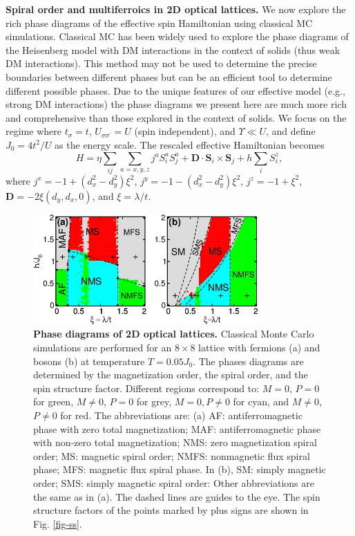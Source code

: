 \documentclass[a4paper,showpacs]{revtex4}
\begin{document}
\noindent \textbf{\small {Spiral order and multiferroics in 2D optical lattices.}} We now explore
the rich phase diagrams of the effective spin Hamiltonian using classical MC
simulations. Classical MC has been widely used to explore the phase
diagrams of the Heisenberg model with DM interactions in the context of
solids \cite{Liang-1,Liang-2, Liang-3, Jing} (thus weak DM interactions).
This method may not be used to determine the precise boundaries between
different phases but can be an efficient tool to determine different
possible phases. Due to the unique features of our effective model (e.g.,
strong DM interactions) the phase diagrams we present here are much more
rich and comprehensive than those explored in the context of solids. We
focus on the regime where $t_{\sigma }=t$, $U_{\sigma \sigma ^{\prime }}=U$
(spin independent), and $\Upsilon \ll U$, and define $J_{0}=4t^{2}/U$ as the
energy scale. The rescaled effective Hamiltonian becomes
\begin{equation}
H=\eta \sum_{ij}\sum_{a=x,y,z}j^{a}S_{i}^{a}S_{j}^{a}+\mathbf{D}\cdot
\mathbf{S}_{i}\times \mathbf{S}_{j}+h\sum_{i}S_{i}^{z},  \label{totalmodel}
\end{equation}%
where $j^{x}=-1+(d_{x}^{2}-d_{y}^{2})\xi ^{2}$, $%
j^{y}=-1-(d_{x}^{2}-d_{y}^{2})\xi ^{2}$, $j^{z}=-1+\xi ^{2}$, $\mathbf{D}%
=-2\xi (d_{y},d_{x},0)$, and $\xi =\lambda /t$.

\begin{figure}[b]
\centering
\includegraphics[width=3.4in]{new-phaseAB}
\caption{{\bf\sffamily Phase diagrams of 2D optical lattices.} Classical Monte Carlo simulations are performed for an $8\times 8$
lattice with fermions (a) and bosons (b) at temperature $T=0.05J_{0}$. The phases diagrams are determined by
the magnetization order, the spiral order, and the spin structure factor.
Different regions correspond to: $M=0$, $P=0$ for green, $M\neq 0$, $P=0$
for grey, $M=0,P\neq 0$ for cyan, and $M\neq 0$, $P\neq 0$ for red. The
abbreviations are: (a) AF: antiferromagnetic phase with zero total
magnetization; MAF: antiferromagnetic phase with non-zero total
magnetization; NMS: zero magnetization spiral order; MS: magnetic spiral
order; NMFS: nonmagnetic flux spiral phase; MFS: magnetic flux spiral phase.
In (b), SM: simply magnetic order; SMS: simply magnetic spiral order: Other
abbreviations are the same as in (a). The dashed lines are guides to the
eye. The spin structure factors of the points marked by plus signs are shown
in Fig. \protect\ref{fig-ss}.}
\label{fig-phasediag}
\end{figure}
\end{document}
